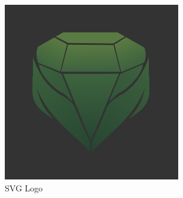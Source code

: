 \documentclass[a4paper]{article}
\begin{document}
\begin{figure}[h!]
\begin{subfigure}[b]{0.3\linewidth}
    \includegraphics[width=\linewidth]{images/logo.png}
    \caption{SVG Logo}
    \label{fig:logo}
  \end{subfigure}
   \begin{subfigure}[b]{0.3\linewidth}

\end{subfigure}
\end{figure}
\end{document}
